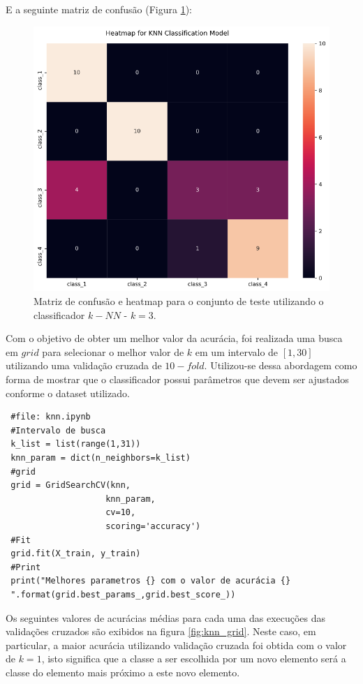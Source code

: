 \documentclass[
	article,			%
	11pt,				%
	oneside,			%
	a4paper,			%
	english,			%
	brazil,				%
	sumario=tradicional
	]{abntex2}
\begin{document}
E a seguinte matriz de confusão (Figura \ref{fig:knn_cm01}):

\begin{figure}[H]
 \centering
 \includegraphics[scale=0.35]{fig/knn_cm01.png}
 \caption{Matriz de confusão e heatmap para o conjunto de teste utilizando o classificador $k-NN$ - $k=3$.}
 \label{fig:knn_cm01}
\end{figure}

Com o objetivo de obter um melhor valor da acurácia, foi realizada uma busca em $grid$ para selecionar o melhor valor de $k$ em um intervalo de $[1,30]$ utilizando uma validação cruzada de $10-fold$. Utilizou-se dessa abordagem como forma de mostrar que o classificador possui parâmetros que devem ser ajustados conforme o dataset utilizado. 

\begin{verbatim}
 #file: knn.ipynb
 #Intervalo de busca
 k_list = list(range(1,31))
 knn_param = dict(n_neighbors=k_list)
 #grid
 grid = GridSearchCV(knn,
                    knn_param, 
                    cv=10, 
                    scoring='accuracy')
 #Fit
 grid.fit(X_train, y_train)
 #Print
 print("Melhores parametros {} com o valor de acurácia {}
 ".format(grid.best_params_,grid.best_score_))
\end{verbatim}


Os seguintes valores de acurácias médias para cada uma das execuções das validações cruzados são exibidos na figura \ref{fig:knn_grid}. Neste caso, em particular, a maior acurácia utilizando validação cruzada foi obtida com o valor de $k=1$, isto significa que a classe a ser escolhida por um novo elemento será a classe do elemento mais próximo a este novo elemento.
\end{document}
